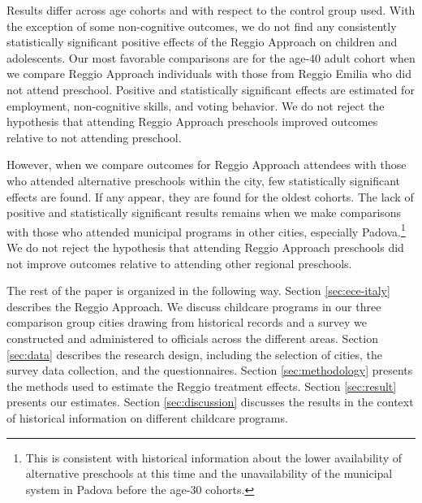 Results differ across age cohorts and with respect to the control group used. With the exception of some non-cognitive outcomes, we do not find any consistently statistically significant positive effects of the Reggio Approach on children and adolescents. Our most favorable comparisons are for the age-40 adult cohort when we compare Reggio Approach individuals with those from Reggio Emilia who did not attend preschool. Positive and statistically significant effects are estimated for employment, non-cognitive skills, and voting behavior. We do not reject the hypothesis that attending Reggio Approach preschools improved outcomes relative to not attending preschool.

However, when we compare outcomes for Reggio Approach attendees with those who attended alternative preschools within the city, few statistically significant effects are found. If any appear, they are found for the oldest cohorts. The lack of positive and statistically significant results remains when we make comparisons with those who attended municipal programs in other cities, especially Padova.\footnote{This is consistent with historical information about the lower availability of alternative preschools at this time and the unavailability of the municipal system in Padova before the age-30 cohorts.} We do not reject the hypothesis that attending Reggio Approach preschools did not improve outcomes relative to attending other regional preschools.

The rest of the paper is organized in the following way. Section \ref{sec:ece-italy} describes the Reggio Approach. We discuss childcare programs in our three comparison group cities drawing from historical records and a survey we constructed and administered to officials across the different areas. Section \ref{sec:data} describes the research design, including the selection of cities, the survey data collection, and the questionnaires. Section \ref{sec:methodology} presents the methods used to estimate the Reggio treatment effects. Section \ref{sec:result} presents our estimates. Section \ref{sec:discussion} discusses the results in the context of historical information on different childcare programs.

